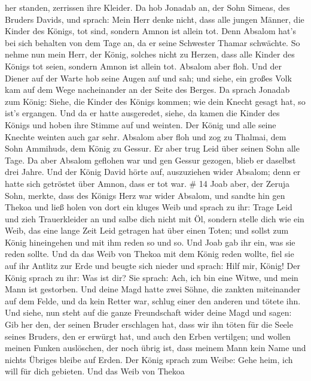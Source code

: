 her standen, zerrissen ihre Kleider.  Da hob Jonadab an,
der Sohn Simeas, des Bruders Davids, und sprach: Mein Herr denke nicht,
dass alle jungen Männer, die Kinder des Königs, tot sind, sondern Amnon
ist allein tot. Denn Absalom hat's bei sich behalten von dem Tage an, da
er seine Schwester Thamar schwächte.  So nehme nun mein
Herr, der König, solches nicht zu Herzen, dass alle Kinder des Königs
tot seien, sondern Amnon ist allein tot.  Absalom aber
floh. Und der Diener auf der Warte hob seine Augen auf und sah; und
siehe, ein großes Volk kam auf dem Wege nacheinander an der Seite des
Berges.  Da sprach Jonadab zum König: Siehe, die Kinder des
Königs kommen; wie dein Knecht gesagt hat, so ist's ergangen.
 Und da er hatte ausgeredet, siehe, da kamen die Kinder des
Königs und hoben ihre Stimme auf und weinten. Der König und alle seine
Knechte weinten auch gar sehr.  Absalom aber floh und zog
zu Thalmai, dem Sohn Ammihuds, dem König zu Gessur. Er aber trug Leid
über seinen Sohn alle Tage.  Da aber Absalom geflohen war
und gen Gessur gezogen, blieb er daselbst drei Jahre.  Und
der König David hörte auf, auszuziehen wider Absalom; denn er hatte sich
getröstet über Amnon, dass er tot war. \# 14  Joab aber, der
Zeruja Sohn, merkte, dass des Königs Herz war wider Absalom,
 und sandte hin gen Thekoa und ließ holen von dort ein
kluges Weib und sprach zu ihr: Trage Leid und zieh Trauerkleider an und
salbe dich nicht mit Öl, sondern stelle dich wie ein Weib, das eine
lange Zeit Leid getragen hat über einen Toten;  und sollst
zum König hineingehen und mit ihm reden so und so. Und Joab gab ihr ein,
was sie reden sollte.  Und da das Weib von Thekoa mit dem
König reden wollte, fiel sie auf ihr Antlitz zur Erde und beugte sich
nieder und sprach: Hilf mir, König!  Der König sprach zu
ihr: Was ist dir? Sie sprach: Ach, ich bin eine Witwe, und mein Mann ist
gestorben.  Und deine Magd hatte zwei Söhne, die zankten
miteinander auf dem Felde, und da kein Retter war, schlug einer den
anderen und tötete ihn.  Und siehe, nun steht auf die ganze
Freundschaft wider deine Magd und sagen: Gib her den, der seinen Bruder
erschlagen hat, dass wir ihn töten für die Seele seines Bruders, den er
erwürgt hat, und auch den Erben vertilgen; und wollen meinen Funken
auslöschen, der noch übrig ist, dass meinem Mann kein Name und nichts
Übriges bleibe auf Erden.  Der König sprach zum Weibe: Gehe
heim, ich will für dich gebieten.  Und das Weib von Thekoa
